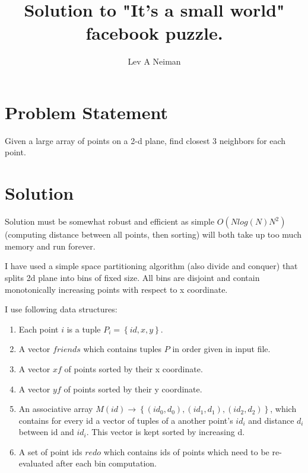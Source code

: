 \documentclass[11pt]{article}
\begin{document}
\title{Solution to "It's a small world" facebook puzzle\cite{smallworld}.}
\author{Lev A Neiman}

\maketitle

\section{Problem Statement}

Given a large array of points on a 2-d plane, find closest 3 neighbors for each point.  

\section{Solution}

Solution must be somewhat robust and efficient as simple $ O(Nlog(N)N^{2}) $ (computing distance between all points, then sorting) will both take  up too much memory and run forever.

I have used a simple space partitioning algorithm (also divide and conquer) that splits 2d plane into bins of fixed size.  All bins are disjoint and contain monotonically increasing points with respect to x coordinate.  

I use following data structures:
\begin{enumerate}
\item Each point $i$ is a tuple $P_{i}=\left \{ id,x,y \right \}$.
\item A vector $friends$ which contains tuples $P$ in order given in input file.
\item A vector $xf$ of points sorted by their x coordinate.
\item A vector $yf$ of points sorted by their y coordinate.
\item An associative array $M(id)\to \left \{ (id_{0},d_{0}), (id_{1},d_{1}), (id_{2}, d_{2}) \right \}$, which contains for every id a vector of tuples of a another point's $id_{i}$ and distance $d_{i}$ between id and $id_{i}$.  This vector is kept sorted by increasing d.
\item A set of point ids $redo$ which contains ids of points which need to be re-evaluated after each bin computation.  
\end{enumerate}
\end{document}

